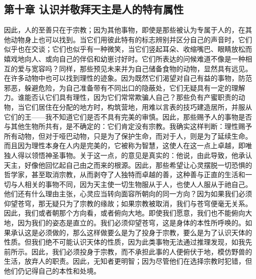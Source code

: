 
\subsection{第十章 认识并敬拜天主是人的特有属性}

因此，人的至善只在于宗教；因为其他事物，即使是那些被认为专属于人的，在其他动物身上也可以找到。当它们用彼此特有的标志辨别并区分自己的声音时，它们似乎也在交谈；它们也似乎有一种微笑，当它们竖起耳朵、收缩嘴巴、眼睛放松而嬉戏地向人、或向自己的伴侣和幼崽讨好时。它们所表达的问候难道不像是一种相互的爱与宽容吗？同样，那些预见未来并为自己储备食物的动物，显然具有远见。在许多动物中也可以找到理性的迹象。因为既然它们渴望对自己有益的事物，防范邪恶，躲避危险，为自己准备带有不同出口的隐蔽处，它们无疑具有一定的理解力。谁能否认它们具有理性，因为它们常常欺骗人自己？那些负有产蜜职责的动物，当它们居住在分配的地方时，构筑营地，用难以言表的技巧建造居所，并服从它们的王——我不知道它们是否不具有完美的审慎。因此，那些赐予人的事物是否与其他生物所共有，是不确定的：它们肯定没有宗教。我确实这样判断：理性赐予所有动物，但对于哑巴动物，只是为了保护生命，而对于人，则是为了延续生命。而且因为理性本身在人内是完美的，它被称为智慧，这使人在这一点上卓越，即唯独人得以领悟神圣事物。关于这一点，的意见是真实的：他说，由此导致，他承认天主，好像他回忆起自己由之而来的根源。因此，那些希望让心灵摆脱一切恐惧的哲学家，甚至取消宗教，从而剥夺了人独特而卓越的善，这种善与正直的生活和一切与人相关的事物不同，因为天主使一切生物服从于人，也使人人服从于祂自己。他们还有什么理由主张，心灵应当转向面容所朝向的同一方向？因为如果我们必须仰望苍穹，那无疑只为了宗教的缘故；如果宗教被取消，我们与苍穹便毫无关系。因此，我们或者朝那个方向看，或者俯向大地。即使我们愿意，我们也不能俯向大地，因为我们的姿态是直立的。我们必须仰望苍穹，这是身体的本性所呼唤的。如果承认这是必须做的，那么这样做要么是为了投身于宗教，要么是为了认识天体的性质。但我们绝不可能认识天体的性质，因为此类事物无法通过推理发现，如我先前所示。因此，我们必须投身于宗教，而不承担此事的人便俯伏于地，模仿野兽的生活，放弃人的职责。因此，无知者更明智；因为尽管他们在选择宗教时犯错，但他们仍记得自己的本性和处境。\par


